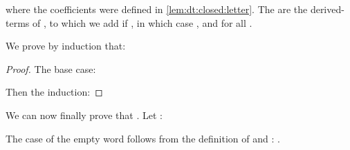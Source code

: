 \documentclass[a4paper,USenglish]{lipics}
\begin{document}
\noindent
where the coefficients  were defined in
\cref{lem:dt:closed:letter}.  The  are the derived-terms of , to
which we add  if , in which case
, and  for
all .

We prove by induction that:


\begin{proof}
  The base case:
  

  Then the induction:
  
\end{proof}

We can now finally prove that .  Let :


The case of the empty word follows from the definition of  and :
.
\end{document}
